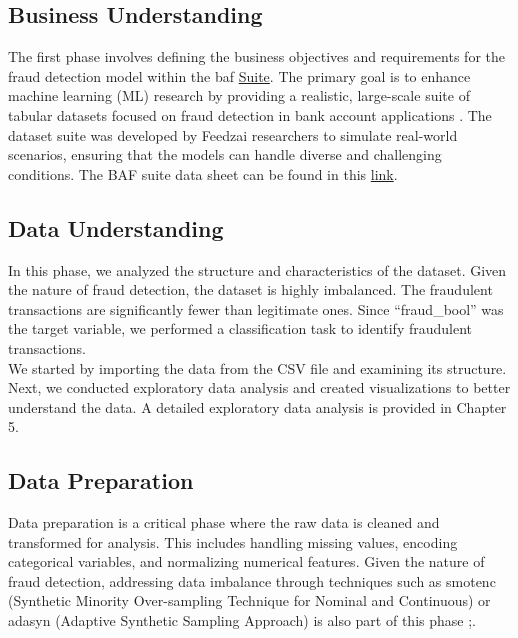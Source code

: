 \documentclass[12pt,a4paper]{report}
\begin{document}
\noindent


\subsection{Business Understanding}
The first phase involves defining the business objectives and requirements for the fraud detection model within the \acrshort{baf} \href{https://www.kaggle.com/datasets/sgpjesus/bank-account-fraud-dataset-neurips-2022/code}{Suite}. The primary goal is to enhance machine learning (ML) research by providing a realistic, large-scale suite of tabular datasets focused on fraud detection in bank account applications \citep{jesus2022turning}. The dataset suite was developed by Feedzai researchers to simulate real-world scenarios, ensuring that the models can handle diverse and challenging conditions. The BAF suite data sheet can be found in this  \href{https://github.com/feedzai/bank-account-fraud/blob/main/documents/datasheet.pdf}{link}.\\



\subsection{Data Understanding}
In this phase, we analyzed the structure and characteristics of the dataset. Given the nature of fraud detection, the dataset is highly imbalanced. The fraudulent transactions are significantly fewer than legitimate ones.  Since ``fraud\_bool'' was the target variable, we performed a classification task to identify fraudulent transactions.\\

We started by importing the data from the CSV file and examining its structure. Next, we conducted exploratory data analysis and created visualizations to better understand the data. A detailed exploratory data analysis is provided in Chapter 5.\\

\subsection{Data Preparation}
Data preparation is a critical phase where the raw data is cleaned and transformed for analysis. This includes handling missing values, encoding categorical variables, and normalizing numerical features. Given the nature of fraud detection, addressing data imbalance through techniques such as \acrshort{smotenc} (Synthetic Minority Over-sampling Technique for Nominal and Continuous) or \acrshort{adasyn} (Adaptive Synthetic Sampling Approach) is also part of this phase \citep{chawla2002smote};\citep{he2008adasyn}.\\
\end{document}
